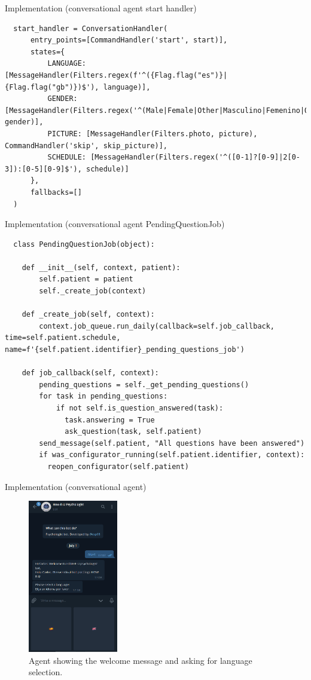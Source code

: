 \documentclass{beamer}
\begin{document}
\begin{frame}[fragile]{Implementation (conversational agent start handler)}
  \begin{verbatim}
  start_handler = ConversationHandler(
      entry_points=[CommandHandler('start', start)],
      states={
          LANGUAGE: [MessageHandler(Filters.regex(f'^({Flag.flag("es")}|{Flag.flag("gb")})$'), language)],
          GENDER: [MessageHandler(Filters.regex('^(Male|Female|Other|Masculino|Femenino|Otro)$'), gender)],
          PICTURE: [MessageHandler(Filters.photo, picture), CommandHandler('skip', skip_picture)],
          SCHEDULE: [MessageHandler(Filters.regex('^([0-1]?[0-9]|2[0-3]):[0-5][0-9]$'), schedule)]
      },
      fallbacks=[]
  )
\end{verbatim}
\end{frame}
\begin{frame}[fragile]{Implementation (conversational agent PendingQuestionJob)}
  \begin{verbatim}
  class PendingQuestionJob(object):

    def __init__(self, context, patient):
        self.patient = patient
        self._create_job(context)

    def _create_job(self, context):
        context.job_queue.run_daily(callback=self.job_callback, time=self.patient.schedule, name=f'{self.patient.identifier}_pending_questions_job')

    def job_callback(self, context):
        pending_questions = self._get_pending_questions()
        for task in pending_questions:
            if not self.is_question_answered(task):
              task.answering = True
              ask_question(task, self.patient)
        send_message(self.patient, "All questions have been answered")
        if was_configurator_running(self.patient.identifier, context):
          reopen_configurator(self.patient)
\end{verbatim}
\end{frame}
\begin{frame}[fragile]{Implementation (conversational agent)}
  \begin{figure}[H]
    \centering
      \includegraphics[width=0.35\textwidth]{start.png}
      \caption{Agent showing the welcome message and asking for language selection.}
  \end{figure}
\end{frame}
\end{document}
